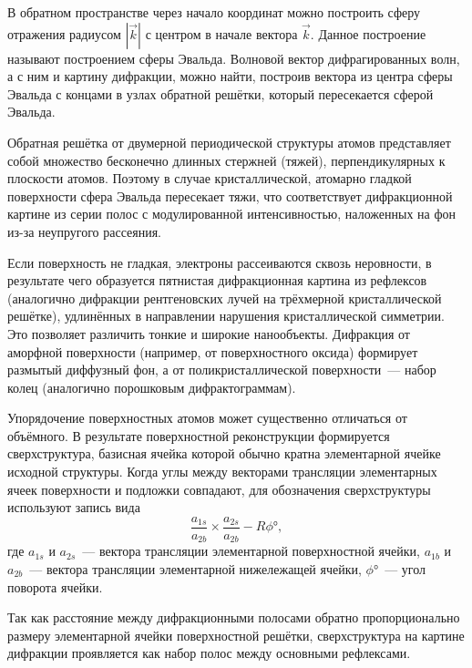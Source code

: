 В обратном пространстве через начало координат можно построить сферу отражения
радиусом \(| \vec{k} |\) с центром в начале вектора \(\vec{k}\). Данное
построение называют построением сферы Эвальда. Волновой вектор дифрагированных
волн, а с ним и картину дифракции, можно найти, построив вектора из центра
сферы Эвальда с концами в узлах обратной решётки, который пересекается сферой
Эвальда.

Обратная решётка от двумерной периодической структуры атомов представляет собой
множество бесконечно длинных стержней (тяжей), перпендикулярных к плоскости
атомов. Поэтому в случае кристаллической, атомарно гладкой поверхности сфера
Эвальда пересекает тяжи, что соответствует дифракционной картине из серии полос
с модулированной интенсивностью, наложенных на фон из-за неупругого рассеяния.

Если поверхность не гладкая, электроны рассеиваются сквозь неровности, в
результате чего образуется пятнистая дифракционная картина из рефлексов
(аналогично дифракции рентгеновских лучей на трёхмерной кристаллической
решётке), удлинённых в направлении нарушения кристаллической симметрии. Это
позволяет различить тонкие и широкие нанообъекты. Дифракция от аморфной
поверхности (например, от поверхностного оксида) формирует размытый диффузный
фон, а от поликристаллической поверхности~--- набор колец (аналогично
порошковым дифрактограммам).

Упорядочение поверхностных атомов может существенно отличаться от объёмного. В
результате поверхностной реконструкции формируется сверхструктура, базисная
ячейка которой обычно кратна элементарной ячейке исходной структуры. Когда углы
между векторами трансляции элементарных ячеек поверхности и подложки совпадают,
для обозначения сверхструктуры используют запись вида \begin{equation}
\label{eq:eq_3} \frac{a_{1s}}{a_{2b}} \times
\frac{a_{2s}}{a_{2b}}-R\phi\si{\degree}, \end{equation} где \(a_{1s}\) и
\(a_{2s}\)~--- вектора трансляции элементарной поверхностной ячейки, \(a_{1b}\)
и \(a_{2b}\)~--- вектора трансляции элементарной нижележащей ячейки,
\(\phi\si{\degree}\)~--- угол поворота ячейки.

Так как расстояние между дифракционными полосами обратно пропорционально
размеру элементарной ячейки поверхностной решётки, сверхструктура на картине
дифракции проявляется как набор полос между основными рефлексами.

